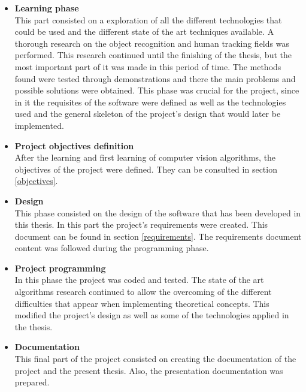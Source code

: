 \begin{appendices}
\begin{itemize}
			 	\item{\textbf{Learning phase}} \\
			 	This part consisted on a exploration of all the different technologies that could be used and the different state of the art techniques available. A thorough research on the object recognition and human tracking fields was performed. This research continued until the finishing of the thesis, but the most important part of it was made in this period of time. 
			 	The methods found were tested through demonstrations and there the main problems and possible solutions were obtained. This phase was crucial for the project, since in it the requisites of the software were defined as well as the technologies used and the general skeleton of the project's design that would later be implemented. 
			 	\\

			 	\item{\textbf{Project objectives definition}} \\

			 	After the learning and first learning of computer vision algorithms, the objectives of the project were defined. 
			 	They can be consulted in section \ref{objectives}. 

			 	\item{\textbf{Design}} \\
			 	This phase consisted on the design of the software that has been developed in this thesis. 
			 	In this part the project's requirements were created. 
			 	This document can be found in section \ref{requirements}. 
			 	The requirements document content was followed during the programming phase. 

			 	\item{\textbf{Project programming}}\\
			 	In this phase the project was coded and tested. The state of the art algorithms research continued to allow the overcoming of the different difficulties that appear when implementing theoretical concepts. This modified the project's design as well as some of the technologies applied in the thesis. 

			 	\item{\textbf{Documentation}}\\
			 	This final part of the project consisted on creating the documentation of the project and the present thesis. 
			 	Also, the presentation documentation was prepared. 
			 	\\
		 \end{itemize}


\end{appendices}
